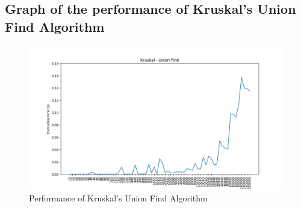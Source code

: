 \subsection{Graph of the performance of Kruskal's Union Find Algorithm}

	\begin{figure}[H]
		\hspace{-1cm}\includegraphics[width=19cm]{Img/Kruskal_UF_Graph.png}
		\caption{Performance of Kruskal's Union Find Algorithm}
	\end{figure}

\pagebreak